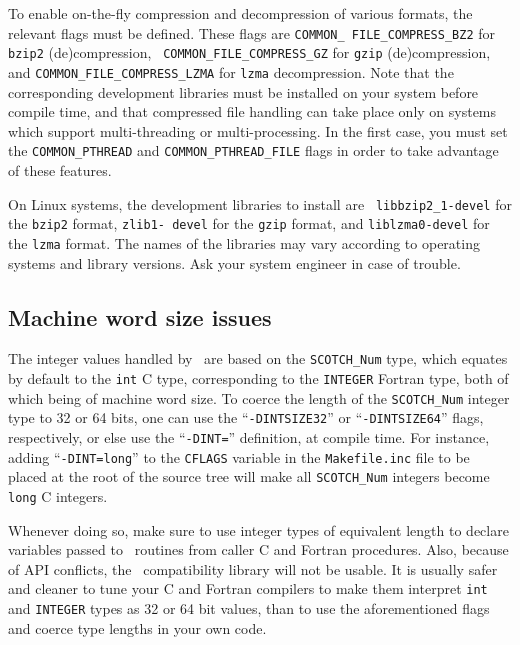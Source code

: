 To enable on-the-fly compression and decompression of various formats,
the relevant flags must be defined. These flags are {\tt COMMON\_\lbt
FILE\_\lbt COMPRESS\_\lbt BZ2} for {\tt bzip2} (de)compression, {\tt
COMMON\_\lbt FILE\_\lbt COMPRESS\_\lbt GZ} for {\tt gzip}
(de)compression, and {\tt COMMON\_\lbt FILE\_\lbt COMPRESS\_\lbt LZMA}
for {\tt lzma} decompression. Note that the corresponding
development libraries must be installed on your system before compile
time, and that compressed file handling can take place only on systems
which support multi-threading or multi-processing. In the first case,
you must set the {\tt COMMON\_\lbt PTHREAD} and
{\tt COMMON\_\lbt PTHREAD\_\lbt FILE} flags in order to take advantage
of these features.

On Linux systems, the development libraries to install are {\tt
libbzip2\_1-\lbt devel} for the {\tt bzip2} format, {\tt zlib1-\lbt
devel} for the {\tt gzip} format, and {\tt liblzma0-\lbt devel} for
the {\tt lzma} format. The names of the libraries may vary according
to operating systems and library versions. Ask your system engineer in
case of trouble.

\subsection{Machine word size issues}
\label{sec-install-inttypesize}

The integer values handled by \scotch\ are based on the
{\tt SCOTCH\_\lbt Num} type, which equates by default to the {\tt int}
C type, corresponding to the {\tt INTEGER} Fortran type, both of which
being of machine word size. To coerce the length of the
{\tt SCOTCH\_\lbt Num} integer type to 32 or 64 bits, one can use the
``{\tt -DINTSIZE32}'' or ``{\tt -DINTSIZE64}'' flags, respectively, or
else use the ``{\tt -DINT=}'' definition, at compile time. For
instance, adding ``{\tt -DINT=long}'' to the {\tt CFLAGS} variable in
the {\tt Makefile.inc} file to be placed at the root of the source
tree will make all {\tt SCOTCH\_\lbt Num} integers become {\tt long} C
integers.

Whenever doing so, make sure to use integer types of equivalent length
to declare variables passed to \scotch\ routines from caller C and
Fortran procedures. Also, because of API conflicts, the
\metis\ compatibility library will not be usable. It is usually safer
and cleaner to tune your C and Fortran compilers to make them
interpret {\tt int} and {\tt INTEGER} types as 32 or 64 bit values,
than to use the aforementioned flags and coerce type lengths in your
own code.

